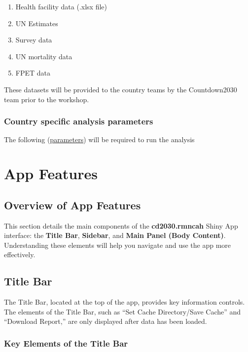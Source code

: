 \documentclass[
  english,
  letterpaper,
  DIV=11,
  numbers=noendperiod]{scrreprt}
\providecommand{\tightlist}{%
  \setlength{\itemsep}{0pt}\setlength{\parskip}{0pt}}
\begin{document}
\begin{enumerate}
\def\labelenumi{\arabic{enumi}.}
\tightlist
\item
  Health facility data (.xlsx file)
\item
  UN Estimates
\item
  Survey data
\item
  UN mortality data
\item
  FPET data
\end{enumerate}

These datasets will be provided to the country teams by the
Countdown2030 team prior to the workshop.

\subsection{Country specific analysis
parameters}\label{country-specific-analysis-parameters}

The following (\hyperref[sec-denom-analysis-setup]{parameters}) will be
required to run the analysis

\chapter{App Features}\label{app-features}

\section{Overview of App Features}\label{overview-of-app-features}

This section details the main components of the \textbf{cd2030.rmncah}
Shiny App interface: the \textbf{Title Bar}, \textbf{Sidebar}, and
\textbf{Main Panel (Body Content)}. Understanding these elements will
help you navigate and use the app more effectively.

\section{Title Bar}\label{title-bar}

The Title Bar, located at the top of the app, provides key information
controls. The elements of the Title Bar, such as ``Set Cache
Directory/Save Cache'' and ``Download Report,'' are only displayed after
data has been loaded.

\subsection{Key Elements of the Title
Bar}\label{key-elements-of-the-title-bar}
\end{document}
